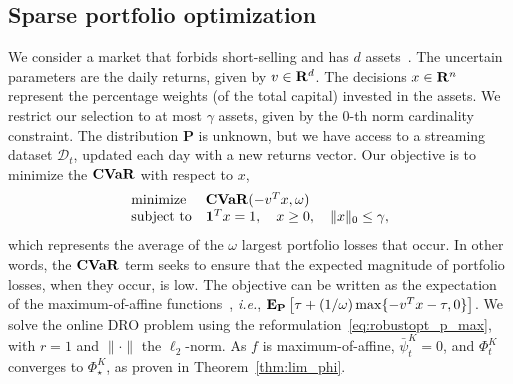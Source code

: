 \documentclass[12pt]{article}
\newcommand{\ie}{{\it i.e.}}
\newcommand{\ones}{\mathbf 1}
\newcommand{\reals}{{\bf R}}
\newcommand{\prob}{{\mathbf P}}
\newcommand{\Expect}{{\mbox{\bf E}}}
\newcommand{\CVaR}{\mathop{\bf CVaR}}
\begin{document}

\subsection{Sparse portfolio optimization}
\label{sub:sparse_portfolio_optimization}
We consider a market that forbids short-selling and has $d$ assets~\cite{mro,kuhn2019wasserstein}.
The uncertain parameters are the daily returns, given by $v \in \reals^d$.
The decisions ${x\in \reals^n}$ represent the percentage weights (of the total capital) invested in the assets.
We restrict our selection to at most $\gamma$ assets, given by the $0$-th norm cardinality constraint.
The distribution $\prob$ is unknown, but we have access to a streaming dataset $\mathcal{D}_t$, updated each day with a new returns vector. 
Our objective is to minimize the $\CVaR$ with respect to $x$,
\begin{equation*}
	\label{eq:portfolio}
	\begin{array}{ll}
	\text{minimize  } &\CVaR(- v^Tx,\omega)\\
	\text{subject to} & \ones^T x = 1, \quad x \ge 0, \quad \|x\|_0 \leq \gamma,
	\end{array}
\end{equation*}
which represents the average of the $\omega$ largest portfolio losses that occur. In other words, the $\CVaR$ term seeks to ensure that the expected magnitude of portfolio losses, when they occur, is low.
The objective can be written as the expectation of the maximum-of-affine functions~\cite{cvaropt}, \ie, $\Expect_{\prob}\left[\tau +(1/\omega) \max\{-v^Tx -\tau, 0\}\right]$. 
We solve the online \gls{DRO} problem using the reformulation~\eqref{eq:robustopt_p_max}, with $r=1$ and $\|\cdot\|$ the $\ell_2$-norm. 
As $f$ is maximum-of-affine, $\bar{\psi}_t^K=0$, and $\Phi^K_t$ converges to $\Phi^K_\star$\ifpreprint, as proven in Theorem~\ref{thm:lim_phi}\fi.
\end{document}
